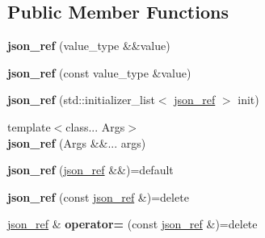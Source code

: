 \subsection*{Public Member Functions}
\begin{DoxyCompactItemize}
\item 
\mbox{\label{classnlohmann_1_1detail_1_1json__ref_ae1adf5bcee8b6fa0c358710604fb1938}} 
{\bfseries json\+\_\+ref} (value\+\_\+type \&\&value)
\item 
\mbox{\label{classnlohmann_1_1detail_1_1json__ref_a8c3eb3c6e952ed0cd7eece586ab4047c}} 
{\bfseries json\+\_\+ref} (const value\+\_\+type \&value)
\item 
\mbox{\label{classnlohmann_1_1detail_1_1json__ref_adfba2db547283a7c6a5df9a32e72efc5}} 
{\bfseries json\+\_\+ref} (std\+::initializer\+\_\+list$<$ \mbox{\hyperlink{classnlohmann_1_1detail_1_1json__ref}{json\+\_\+ref}} $>$ init)
\item 
\mbox{\label{classnlohmann_1_1detail_1_1json__ref_abe3ef8c2f07430bd5699bbd552f9e9c3}} 
{\footnotesize template$<$class... Args$>$ }\\{\bfseries json\+\_\+ref} (Args \&\&... args)
\item 
\mbox{\label{classnlohmann_1_1detail_1_1json__ref_a59221ddbd756ca24d289c787fab38dbc}} 
{\bfseries json\+\_\+ref} (\mbox{\hyperlink{classnlohmann_1_1detail_1_1json__ref}{json\+\_\+ref}} \&\&)=default
\item 
\mbox{\label{classnlohmann_1_1detail_1_1json__ref_a4c68db46934e03588bbd73b00147c0dd}} 
{\bfseries json\+\_\+ref} (const \mbox{\hyperlink{classnlohmann_1_1detail_1_1json__ref}{json\+\_\+ref}} \&)=delete
\item 
\mbox{\label{classnlohmann_1_1detail_1_1json__ref_a98956ba676b1ae16b62346f9c4fb752e}} 
\mbox{\hyperlink{classnlohmann_1_1detail_1_1json__ref}{json\+\_\+ref}} \& {\bfseries operator=} (const \mbox{\hyperlink{classnlohmann_1_1detail_1_1json__ref}{json\+\_\+ref}} \&)=delete
\item 

\end{DoxyCompactItemize}
